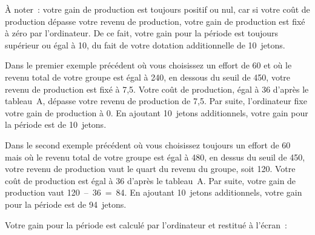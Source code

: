 \begin{Article}
\begin{refsection}[Lebourges]
\begin{appendices}
\newpage

\begin{center}
\noindent{}
\end{center}

À noter~: votre gain de production est toujours positif ou nul, car si
votre coût de production dépasse votre revenu de production, votre gain
de production est fixé à zéro par l'ordinateur. De ce fait, votre gain
pour la période est toujours supérieur ou égal à 10, du fait de votre
dotation additionnelle de 10~jetons.

Dans le premier exemple précédent où vous choisissez un effort de 60 et
où le revenu total de votre groupe est égal à 240, en dessous du seuil
de 450, votre revenu de production est fixé à 7,5. Votre coût de
production, égal à 36 d'après le tableau~A, dépasse votre revenu de
production de 7,5. Par suite, l'ordinateur fixe votre gain de production
à 0. En ajoutant 10~jetons additionnels, votre gain pour la période est
de 10~jetons.

Dans le second exemple précédent où vous choisissez toujours un effort
de 60 mais où le revenu total de votre groupe est égal à 480, en dessus
du seuil de 450, votre revenu de production vaut le quart du revenu du
groupe, soit 120. Votre coût de production est égal à 36 d'après le
tableau~A. Par suite, votre gain de production vaut 120~--~36~=~84. En
ajoutant 10~jetons additionnels, votre gain pour la période est de
94~jetons.

Votre gain pour la période est calculé par l'ordinateur et restitué à
l'écran~:

\vspace{0,2cm}


\end{appendices}
\end{refsection}
\end{Article}
